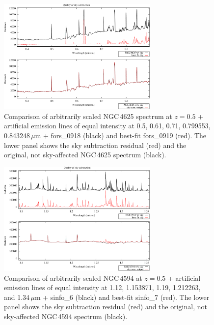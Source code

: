\begin{figure}
\centering
\includegraphics[width=0.7\textwidth,clip=true]
{figures/N4625-FORS_overplot_w_gal.pdf}
\caption[]{Comparison of arbitrarily scaled NGC\,4625 spectrum at $z = 0.5$ +
artificial emission lines of equal intensity at 0.5, 0.61, 0.71, 0.799553,
0.843248\,$\mu$m + fors\_0918 (black) and best-fit fors\_0919 (red). The lower
panel shows the sky subtraction residual (red) and the original, not
sky-affected NGC\,4625 spectrum (black).}
\label{fig:fors_1_n4625}
\end{figure}

\begin{figure}
\centering
\includegraphics[width=0.7\textwidth,clip=true]
{figures/N4594-SINFO-J_overplot_w_gal.pdf}
\caption[]{Comparison of arbitrarily scaled NGC\,4594 at $z = 0.5$ + artificial
emission lines of equal intensity at 1.12, 1.153871, 1.19, 1.212263, and
1.34\,$\mu$m + sinfo\_6 (black) and best-fit sinfo\_7 (red). The lower panel
shows the sky subtraction residual (red) and the original, not sky-affected
NGC\,4594 spectrum (black).}
\label{fig:sinfo_J_n4594}
\end{figure}


